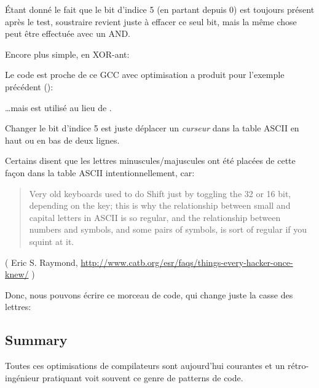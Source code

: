 Étant donné le fait que le bit d'indice 5 (en partant depuis 0) est toujours présent
après le test, soustraire revient juste à effacer ce seul bit, mais la même chose
peut être effectuée avec un AND.

Encore plus simple, en XOR-ant:



Le code est proche de ce GCC avec optimisation a produit pour l'exemple précédent
():



\dots mais  est utilisé au lieu de  .

Changer le bit d'indice 5 est juste déplacer un \textit{curseur} dans la table \ac{ASCII}
en haut ou en bas de deux lignes.

Certains disent que les lettres minuscules/majuscules ont été placées de cette façon
dans la table \ac{ASCII} intentionnellement, car:

\begin{framed}
\begin{quotation}
Very old keyboards used to do Shift just by toggling the 32 or 16 bit, depending on the key; this is why the relationship between small and capital letters in ASCII is so regular, and the relationship between numbers and symbols, and some pairs of symbols, is sort of regular if you squint at it.
\end{quotation}
\end{framed}

( Eric S. Raymond, \url{http://www.catb.org/esr/faqs/things-every-hacker-once-knew/} )

Donc, nous pouvons écrire ce morceau de code, qui change juste la casse des lettres:



\subsection{Summary}

Toutes ces optimisations de compilateurs sont aujourd'hui courantes et un rétro-ingénieur
pratiquant voit souvent ce genre de patterns de code.

